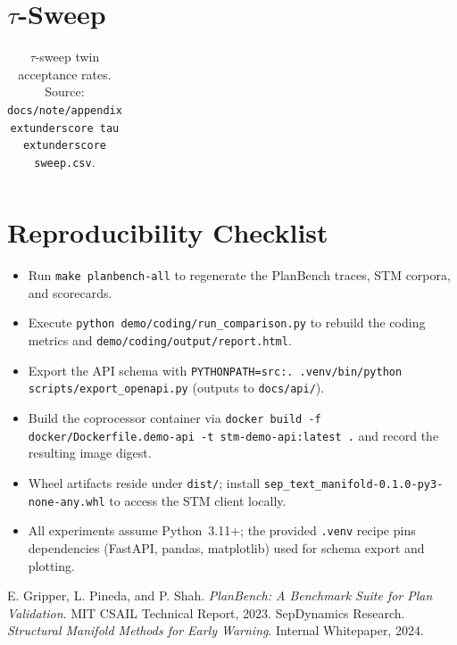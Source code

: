 \documentclass[11pt]{article}
\begin{document}
\section{\texorpdfstring{$\tau$}{tau}-Sweep}
\label{app:tau}
\begin{table}[h]
  \centering
  \caption{$\tau$-sweep twin acceptance rates. Source: \texttt{docs/note/appendix	extunderscore tau	extunderscore sweep.csv}.}
  \begin{tabular}{lccc}
    
  \end{tabular}
\end{table}

\section{Reproducibility Checklist}
\begin{itemize}
  \item Run \texttt{make planbench-all} to regenerate the PlanBench traces, STM corpora, and scorecards.
  \item Execute \texttt{python demo/coding/run\_comparison.py} to rebuild the coding metrics and \texttt{demo/coding/output/report.html}.
  \item Export the API schema with \texttt{PYTHONPATH=src:. .venv/bin/python scripts/export\_openapi.py} (outputs to \texttt{docs/api/}).
  \item Build the coprocessor container via \texttt{docker build -f docker/Dockerfile.demo-api -t stm-demo-api:latest .} and record the resulting image digest.
  \item Wheel artifacts reside under \texttt{dist/}; install \texttt{sep\_text\_manifold-0.1.0-py3-none-any.whl} to access the STM client locally.
  \item All experiments assume Python~3.11+; the provided \texttt{.venv} recipe pins dependencies (FastAPI, pandas, matplotlib) used for schema export and plotting.
\end{itemize}

\begin{thebibliography}{9}
 E. Gripper, L. Pineda, and P. Shah. \emph{PlanBench: A Benchmark Suite for Plan Validation}. MIT CSAIL Technical Report, 2023.
 SepDynamics Research. \emph{Structural Manifold Methods for Early Warning}. Internal Whitepaper, 2024.
\end{thebibliography}
\end{document}
